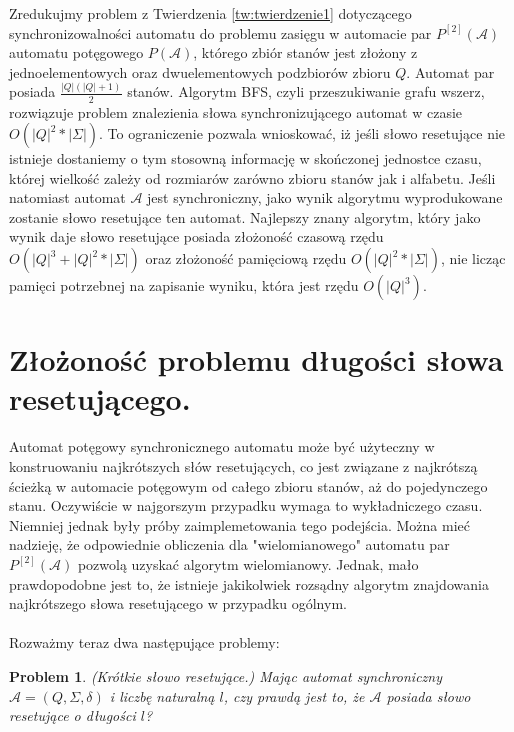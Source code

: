 \documentclass[12pt,a4paper]{article}
\newtheorem{pro}{Problem}[section]
\begin{document}
Zredukujmy problem z Twierdzenia \ref{tw:twierdzenie1} dotycz\k{a}cego synchronizowalno\'{s}ci automatu do problemu zasi\k{e}gu w automacie par $P^{[2]}(\mathscr{A})$ automatu pot\k{e}gowego $P(\mathscr{A})$, kt\'{o}rego zbi\'{o}r stan\'{o}w jest z{\l}o\.{z}ony z jednoelementowych oraz dwuelementowych podzbior\'{o}w zbioru $Q$. Automat par posiada $\frac{|Q|(|Q|+1)}{2}$ stan\'{o}w. Algorytm BFS, czyli przeszukiwanie grafu wszerz, rozwi\k{a}zuje problem znalezienia s{\l}owa synchronizuj\k{a}cego automat w czasie $O(|Q|^2*|\Sigma|)$. To ograniczenie pozwala wnioskowa\'{c}, i\.{z} je\'{s}li s{\l}owo resetuj\k{a}ce nie istnieje dostaniemy o tym stosown\k{a} informacj\k{e} w sko\'{n}czonej jednostce czasu, kt\'{o}rej wielko\'{s}\'{c} zale\.{z}y od rozmiar\'{o}w zar\'{o}wno zbioru stan\'{o}w jak i alfabetu. Je\'{s}li natomiast automat $\mathscr{A}$ jest synchroniczny, jako wynik algorytmu wyprodukowane zostanie s{\l}owo resetuj\k{a}ce ten automat. Najlepszy znany algorytm, kt\'{o}ry jako wynik daje s{\l}owo resetuj\k{a}ce posiada z{\l}o\.{z}ono\'{s}\'{c} czasow\k{a} rz\k{e}du $O(|Q|^3+|Q|^2*|\Sigma|)$ oraz z{\l}o\.{z}ono\'{s}\'{c} pami\k{e}ciow\k{a} rz\k{e}du $O(|Q|^2*|\Sigma|)$, nie licz\k{a}c pami\k{e}ci potrzebnej na zapisanie wyniku, kt\'{o}ra jest rz\k{e}du $O(|Q|^3)$.


\section{Z{\l}o\.zono\'s\'c problemu d{\l}ugo\'{s}ci s{\l}owa resetuj\k{a}cego.}

Automat pot\k{e}gowy synchronicznego automatu mo\.ze by\'c u\.zyteczny w konstruowaniu najkr\'otszych s{\l}\'ow resetuj\k{a}cych, co jest zwi\k{a}zane z najkr\'otsz\k{a} \'scie\.zk\k{a} w automacie pot\k{e}gowym od ca{\l}ego zbioru stan\'ow, a\.z do pojedynczego stanu. Oczywi\'scie w najgorszym przypadku wymaga to wyk{\l}adniczego czasu. Niemniej jednak by{\l}y pr\'oby zaimplemetowania tego podej\'scia. Mo\.zna mie\'c nadziej\k{e}, \.ze odpowiednie obliczenia dla "wielomianowego" automatu par $P^{[2]}(\mathscr{A})$ pozwol\k{a} uzyska\'c algorytm wielomianowy. Jednak, ma{\l}o prawdopodobne jest to, \.ze istnieje jakikolwiek rozs\k{a}dny algorytm znajdowania najkr\'otszego s{\l}owa resetuj\k{a}cego w przypadku og\'olnym.\\ 
\\
Rozwa\.zmy teraz dwa nast\k{e}puj\k{a}ce problemy:

\begin{pro}
\label{problem1}
(Kr\'otkie s{\l}owo resetuj\k{a}ce.) Maj\k{a}c automat synchroniczny  $\mathscr{A}=(Q, \Sigma, \delta)$ i liczb\k{e} naturaln\k{a} $l$, czy prawd\k{a} jest to, \.ze $\mathscr{A}$ posiada s{\l}owo resetuj\k{a}ce o d{\l}ugo\'sci $l$?
\end{pro}
\end{document}
